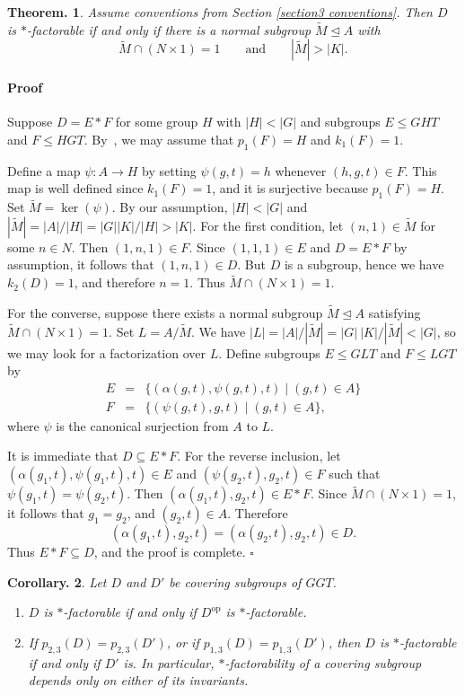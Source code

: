 \documentclass[12pt]{article}
\theoremstyle{change}
\newtheorem{theorem}{Theorem.}[section]
\newtheorem{coro}[theorem]{Corollary.}
\newenvironment{proof}{\paragraph{Proof}}{\hfill$\square$}
\newcommand{\1}{{\bf 1}}
\begin{document}
\begin{theorem}
\label{thm: description2}
Assume conventions from Section \ref{section3 conventions}. Then $D$ is $\ast$-factorable if and only if there is a normal subgroup $\widetilde M \trianglelefteq A$ with
\[
\widetilde M \cap (N\times 1) = 1 \qquad\text{and}\qquad |\widetilde M| > |K|.
\]
\end{theorem}
\begin{proof}
Suppose $D = E * F$ for some group $H$ with $|H|<|G|$ and subgroups $E \leq GHT$ and $F \leq HGT$. By~\cite[Lemma 3.4]{R1}, we may assume that $p_1(F)=H$ and $k_1(F)=1$. 

Define a map $\psi : A \to H$ by setting $\psi(g,t)=h$ whenever $(h,g,t)\in F$. This map is well defined since $k_1(F)=1$, and it is surjective because $p_1(F)=H$.
Set $\widetilde{M} = \ker(\psi)$. By our assumption, $|H|<|G|$ and $|\widetilde{M}| = |A|/|H| = |G||K|/|H| > |K|$. For the first condition, let $(n,1)\in \widetilde{M}$ for some $n\in N$. Then \((1,n,1)\in F\). Since \((1,1,1)\in E\) and \(D=E*F\) by assumption, it follows that \((1,n,1)\in D\). But $D$ is a  subgroup, hence we have $k_2(D)=1$, and therefore $n=1$. Thus $\widetilde{M}\cap (N\times 1)=1$.

For the converse, suppose there exists a normal subgroup $\widetilde{M}\unlhd A$ 
satisfying \( \widetilde{M}\cap (N \times 1)=1\). Set $L = A/\widetilde{M}$. We have $|L| = |A|/|\widetilde{M}| = |G|\ |K|/|\widetilde{M}| < |G|$, so we may look for a factorization over $L$.
Define subgroups $E\leq GLT$ and $F\leq LGT$ by
\begin{eqnarray*}
E &=& \{(\alpha(g,t),\psi(g,t),t)\mid (g,t)\in A\}\\
F &=& \{(\psi(g,t),g,t)\mid (g,t)\in A\},
\end{eqnarray*}
where $\psi$ is the canonical surjection from $A$ to $L$.

It is immediate that $D \subseteq E*F$. For the reverse inclusion, let $(\alpha(g_1,t),\psi(g_1,t),t)\in E$ and $(\psi(g_2,t),g_2,t)\in F$ such that $\psi(g_1,t)=\psi(g_2,t)$. Then $(\alpha(g_1,t),g_2,t)\in E*F$. Since $\widetilde{M}\cap (N\times 1)=1$, it follows that $g_1=g_2$, and $(g_2,t)\in A$. Therefore
\[
(\alpha(g_1,t),g_2,t)=(\alpha(g_2,t),g_2,t)\in D.
\]
Thus $E*F\subseteq D$, and the proof is complete.
\end{proof}
\begin{coro}\label{cor:invariance}
Let $D$ and $D'$ be covering subgroups of $GGT$.
\begin{enumerate}[leftmargin=2em]
  \item $D$ is $\ast$-factorable if and only if $D^{\mathrm{op}}$ is $\ast$-factorable.
  \item If $p_{2,3}(D)=p_{2,3}(D')$, or if $p_{1,3}(D)=p_{1,3}(D')$, then $D$ is $\ast$-factorable if and only if $D'$ is. In particular, $\ast$-factorability of a covering subgroup depends only on either of its invariants.
\end{enumerate}
\end{coro}
\end{document}
